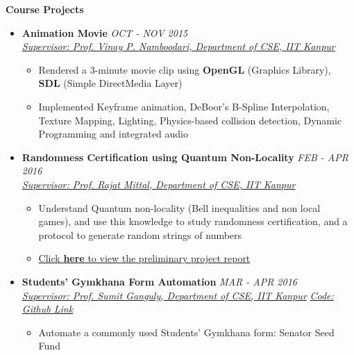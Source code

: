\documentclass[letterpaper,11pt]{article}
\begin{document}
{\pagebreak

\Large{\textbf{Course Projects}}
\small
\begin{itemize}
    \item \textbf{Animation Movie} \hfill \textit{OCT - NOV 2015}\\
    \href{https://sites.google.com/site/vinaynamboodiri/}{\textit{Supervisor: Prof. Vinay P. Namboodari, Department of CSE, IIT Kanpur}}
    \begin{itemize}
        \item Rendered a 3-minute movie clip using \textbf{OpenGL} (Graphics Library), \textbf{SDL} (Simple DirectMedia Layer)
        \item Implemented Keyframe animation, DeBoor's B-Spline Interpolation, Texture Mapping, Lighting, Physics-based collision detection, Dynamic Programming and integrated audio
    \end{itemize}
    \item \textbf{Randomness Certification using Quantum Non-Locality} \hfill \textit{FEB - APR 2016}
        \\
        \href{http://www.cse.iitk.ac.in/users/rmittal/}{\textit{Supervisor: Prof. Rajat Mittal, Department of CSE, IIT Kanpur}}
        \begin{itemize}
            \item Understand Quantum non-locality (Bell inequalities and non local games), and use this knowledge to study randomness certification, and a protocol to generate random strings of numbers
            \item \href{http://home.iitk.ac.in/~kunalkap/CS682_PreProjectReport.pdf}{Click \textbf{here} to view the preliminary project report}
        \end{itemize}
    \item \textbf{Students' Gymkhana Form Automation} \hfill \textit{MAR - APR 2016}\\
        \href{http://www.cse.iitk.ac.in/users/sganguly/}{\textit{Supervisor: Prof. Sumit Ganguly, Department of CSE, IIT Kanpur}} \hfill \textit{\href{https://github.com/kunalapila/SSF}{Code: Github Link}}
        \begin{itemize}
            \item Automate a commonly used Students' Gymkhana form: Senator Seed Fund
        \end{itemize}


\end{itemize}}
\end{document}
